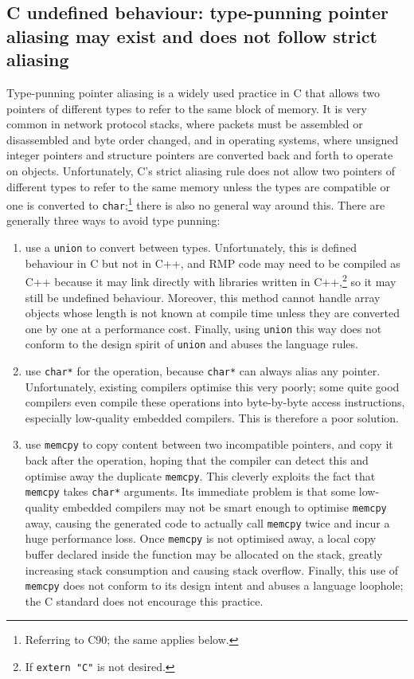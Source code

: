 \subsection{C undefined behaviour: type-punning pointer aliasing may exist and does not follow strict aliasing}

Type-punning pointer aliasing is a widely used practice in C that allows two pointers of different types to refer to the same block of memory.
It is very common in network protocol stacks, where packets must be assembled or disassembled and byte order changed, and in operating systems, where unsigned integer pointers and structure pointers are converted back and forth to operate on objects.
Unfortunately, C's strict aliasing rule does not allow two pointers of different types to refer to the same memory unless the types are compatible or one is converted to \texttt{char};\footnote{Referring to C90; the same applies below.} there is also no general way around this.
There are generally three ways to avoid type punning:

\begin{enumerate}
    \item use a \texttt{union} to convert between types.
    Unfortunately, this is defined behaviour in C but not in C++, and RMP code may need to be compiled as C++ because it may link directly with libraries written in C++,\footnote{If \texttt{extern "C"} is not desired.} so it may still be undefined behaviour.
    Moreover, this method cannot handle array objects whose length is not known at compile time unless they are converted one by one at a performance cost.
    Finally, using \texttt{union} this way does not conform to the design spirit of \texttt{union} and abuses the language rules.
    \item use \texttt{char*} for the operation, because \texttt{char*} can always
    alias any pointer.
    Unfortunately, existing compilers optimise this very poorly; some quite good compilers even compile these operations into byte-by-byte access instructions, especially low-quality embedded compilers.
    This is therefore a poor solution.
    \item use \texttt{memcpy} to copy content between two incompatible pointers,
    and copy it back after the operation, hoping that the compiler can
    detect this and optimise away the duplicate \texttt{memcpy}.
    This cleverly exploits the fact that \texttt{memcpy} takes \texttt{char*} arguments.
    Its immediate problem is that some low-quality embedded compilers may not be smart enough to optimise \texttt{memcpy} away, causing the generated code to actually call \texttt{memcpy} twice and incur a huge performance loss.
    Once \texttt{memcpy} is not optimised away, a local copy buffer declared inside the function may be allocated on the stack, greatly increasing stack consumption and causing stack overflow.
    Finally, this use of \texttt{memcpy} does not conform to its design intent and abuses a language loophole; the C standard does not encourage this practice.
\end{enumerate}

